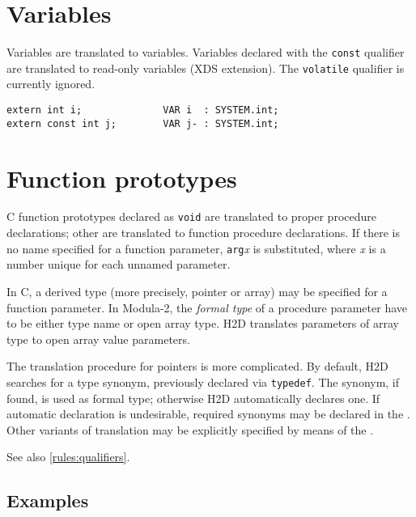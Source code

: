\section{Variables}
\label{rules:variables}

Variables are translated to variables. Variables declared with the
{\tt const} qualifier are translated to read-only variables (XDS extension).
The {\tt volatile} qualifier is currently ignored.  %

\begin{verbatim}
extern int i;              VAR i  : SYSTEM.int;
extern const int j;        VAR j- : SYSTEM.int;
\end{verbatim}


\section{Function prototypes}
\label{rules:functions}

C function prototypes declared as {\tt void} are translated to proper procedure
declarations; other are translated to function procedure declarations.
If there is no name specified for a function parameter, {\tt arg}{\it x}
is substituted, where {\it x} is a number unique for each unnamed parameter.

In C, a derived type (more precisely, pointer or array) may be specified for a
function parameter. In Modula-2, the {\em formal type} of a procedure parameter
have to be either type name or open array type. H2D translates parameters of
array type to open array value parameters.

The translation procedure for pointers is more complicated. By default,
H2D searches for a type synonym, previously declared via \verb'typedef'.
The synonym, if found, is used as formal type; otherwise H2D automatically
declares one. If automatic declaration is undesirable, required synonyms
may be declared in the \ProjectFile{}. Other variants of
translation may be explicitly specified by means of the .

See also \ref{rules:qualifiers}.

\subsection*{Examples}

